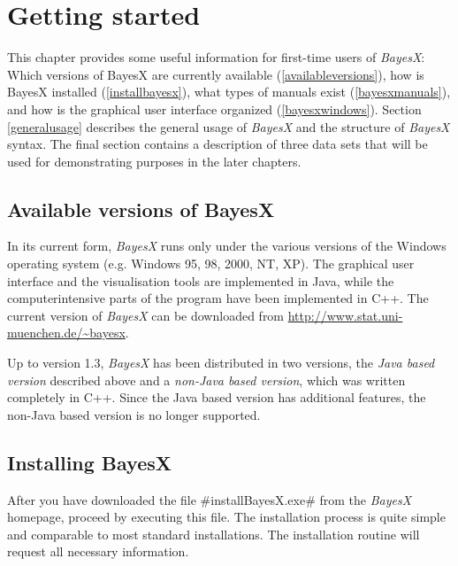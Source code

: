 \chapter{Getting started}
\label{gettingstarted}

This chapter provides some useful information for first-time users
of {\em BayesX}: Which versions of BayesX are currently available
(\autoref{availableversions}), how is BayesX installed
(\autoref{installbayesx}), what types of manuals exist
(\autoref{bayesxmanuals}), and how is the graphical user interface
organized (\autoref{bayesxwindows}). Section \ref{generalusage}
describes the general usage of {\em BayesX} and the structure of
{\em BayesX} syntax. The final section contains a description of
three data sets that will be used for demonstrating purposes in
the later chapters.

\section{Available versions of BayesX}
\label{availableversions}    

In its current form, {\em BayesX} runs only under the various
versions of the Windows operating system (e.g. Windows 95, 98,
2000, NT, XP). The graphical user interface and the visualisation
tools are implemented in Java, while the computerintensive parts
of the program have been implemented in C++. The current version
of {\em BayesX} can be downloaded from
\href{http://www.stat.uni-muenchen.de/~bayesx}
{http://www.stat.uni-muenchen.de/\~{}bayesx}.

Up to version 1.3, {\em BayesX} has been distributed in two
versions, the {\em Java based version} described above and a {\em
non-Java based version}, which was written completely in C++.
Since the Java based version has additional features, the non-Java
based version is no longer supported.

\section{Installing BayesX}\label{installbayesx}
 

After you have downloaded the file #installBayesX.exe# from the
{\em BayesX} homepage, proceed by executing this file. The
installation process is quite simple and comparable to most
standard installations. The installation routine will request all
necessary information.

